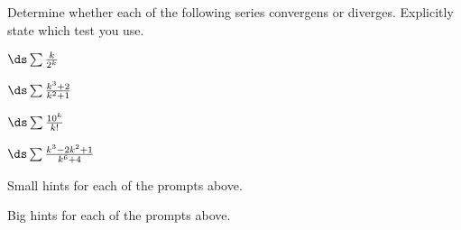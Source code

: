 \begin{activity} \label{8.3.Act9} Determine whether each of the following series  convergens or diverges. Explicitly state which test you use.
\ba
\item $\ds \sum \frac{k}{2^k}$

\item $\ds \sum \frac{k^3+2}{k^2+1}$

\item $\ds \sum \frac{10^k}{k!}$

\item $\ds \sum \frac{k^3-2k^2+1}{k^6+4}$

\ea
\end{activity}

\begin{smallhint}
\ba
	\item Small hints for each of the prompts above.
\ea
\end{smallhint}
\begin{bighint}
\ba
	\item Big hints for each of the prompts above.
\ea
\end{bighint}

